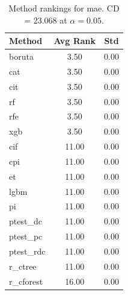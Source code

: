 \begin{table}[h]
\centering
\caption{Method rankings for mae. CD = 23.068 at $\alpha=0.05$.}
\label{tab:ranks_mae}
\begin{tabular}{lcc}
\toprule
Method & Avg Rank & Std \\
\midrule
boruta & 3.50 & 0.00 \\
cat & 3.50 & 0.00 \\
cit & 3.50 & 0.00 \\
rf & 3.50 & 0.00 \\
rfe & 3.50 & 0.00 \\
xgb & 3.50 & 0.00 \\
cif & 11.00 & 0.00 \\
cpi & 11.00 & 0.00 \\
et & 11.00 & 0.00 \\
lgbm & 11.00 & 0.00 \\
pi & 11.00 & 0.00 \\
ptest_dc & 11.00 & 0.00 \\
ptest_pc & 11.00 & 0.00 \\
ptest_rdc & 11.00 & 0.00 \\
r_ctree & 11.00 & 0.00 \\
r_cforest & 16.00 & 0.00 \\
\bottomrule
\end{tabular}
\end{table}